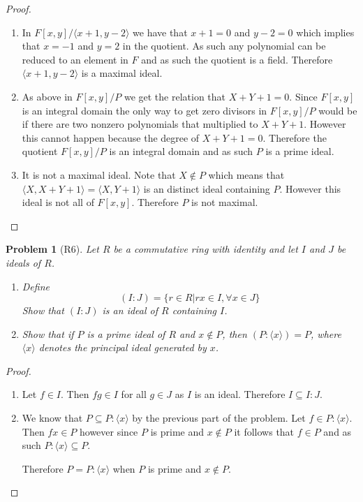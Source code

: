 \documentclass[10pt]{article}
\newcommand{\sk}{\vskip 10mm}
\theoremstyle{plain}
\newtheorem{problem}{Problem}
\theoremstyle{remark}
\begin{document}
\begin{proof}
  \begin{enumerate}
  \item In $F[x,y]/\langle x+1,y-2\rangle$ we have that $x+1=0$ and $y-2=0$ which
    implies that $x=-1$ and $y=2$ in the quotient. As such any polynomial
    can be reduced to an element in $F$ and as such the quotient is a field.
    Therefore $\langle x+1,y-2\rangle$ is a maximal ideal.
  \item As above in $F[x,y]/P$ we get the relation that $X+Y+1=0$. Since
    $F[x,y]$ is an integral domain the only way to get zero divisors in
    $F[x,y]/P$ would be if there are two nonzero polynomials that multiplied
    to $X+Y+1$. However this cannot happen because the degree of $X+Y+1=0$.
    Therefore the quotient $F[x,y]/P$ is an integral domain and as such $P$
    is a prime ideal.
  \item It is not a maximal ideal. Note that $X\notin P$ which means that $\langle X,X+Y+1\rangle=\langle X,Y+1\rangle$
    is an distinct ideal containing $P$.  However this ideal is not all of $F[x,y]$.
    Therefore $P$ is not maximal.
  \end{enumerate}
\end{proof}

\sk


\begin{problem}[R6]
  Let $R$ be a commutative ring with identity and let $I$ and $J$
  be ideals of $R$.
  \begin{enumerate}
  \item Define
    \[ (I:J)=\{r\in R|rx\in I, \forall x\in J\} \]
    Show that $(I:J)$ is an ideal of $R$ containing $I$.
  \item Show that if $P$ is a prime ideal of $R$ and $x\notin P$,
    then $(P:\langle x\rangle)=P$, where $\langle x\rangle$ denotes the
    principal ideal generated by $x$.
  \end{enumerate}
\end{problem}

\begin{proof}
  \begin{enumerate}
  \item Let $f\in I$. Then $fg\in I$ for all $g\in J$ as $I$ is an ideal. Therefore
    $I\subseteq I:J$.
  \item We know that $P\subseteq P:\langle x\rangle$ by the previous part of the problem. Let
    $f\in P:\langle x\rangle$. Then $fx\in P$ however since $P$ is prime and $x\notin P$ it follows
    that $f\in P$ and as such $P:\langle x\rangle\subseteq P$.

    Therefore $P=P:\langle x\rangle$ when $P$ is prime and $x\notin P$.
  \end{enumerate}
\end{proof}
\end{document}
